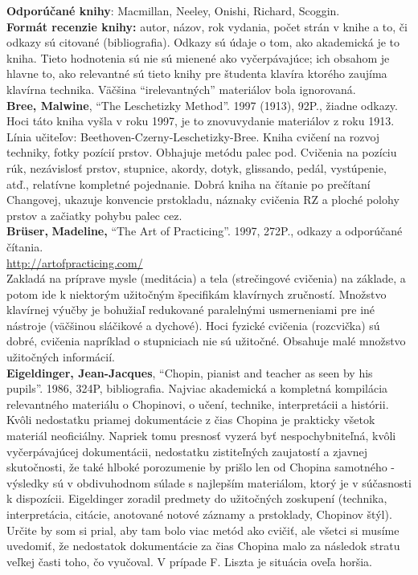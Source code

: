 \documentclass[11pt,a4paper]{book}
\begin{document}
\textbf{Odporúčané knihy}: Macmillan, Neeley, Onishi, Richard, Scoggin.
\medskip\\
\textbf{Formát recenzie knihy:} autor, názov, rok vydania, počet strán v knihe a to, či odkazy sú citované (bibliografia). Odkazy sú údaje o tom, ako akademická je to kniha. Tieto hodnotenia sú nie sú mienené ako vyčerpávajúce; ich obsahom je hlavne to, ako relevantné sú tieto knihy pre študenta klavíra ktorého zaujíma klavírna technika. Väčšina “irelevantných” materiálov bola ignorovaná.
\medskip\\
\textbf{Bree, Malwine}, “The Leschetizky Method”. 1997 (1913), 92P., žiadne odkazy. Hoci táto kniha vyšla v roku 1997, je to znovuvydanie materiálov z roku 1913.\\
Línia učiteľov: Beethoven-Czerny-Leschetizky-Bree. Kniha cvičení na rozvoj techniky, fotky pozícií prstov. Obhajuje metódu palec pod. Cvičenia na pozíciu rúk, nezávislosť prstov, stupnice, akordy, dotyk, glissando, pedál, vystúpenie, atď., relatívne kompletné pojednanie. Dobrá kniha na čítanie po prečítaní Changovej, ukazuje konvencie prstokladu, náznaky cvičenia RZ a ploché polohy prstov a začiatky pohybu palec cez. 
\medskip\\
\textbf{Brüser}\textbf{, }\textbf{Madeline}\textbf{,} “The Art of Practicing”. 1997, 272P., odkazy a odporúčané čítania.\\\href{http://artofpracticing.com/}{http://artofpracticing.com/}\\ Zakladá na príprave mysle (meditácia) a tela (strečingové cvičenia) na základe, a potom ide k niektorým užitočným špecifikám klavírnych zručností. Množstvo klavírnej výučby je bohužiaľ redukované paralelnými  usmerneniami pre iné nástroje (väčšinou sláčikové a dychové). Hoci fyzické cvičenia (rozcvička) sú dobré, cvičenia napríklad o stupniciach nie sú užitočné. Obsahuje malé množstvo užitočných informácií.
\medskip\\
\textbf{\hypertarget{r:eigeldinger}{Eigeldinger, Jean-Jacques}}, “Chopin, pianist and teacher as seen by his pupils”. 1986, 324P, bibliografia. Najviac akademická a kompletná kompilácia relevantného materiálu o Chopinovi, o učení, technike, interpretácii a histórii. Kvôli nedostatku priamej dokumentácie z čias Chopina je prakticky všetok materiál neoficiálny. Napriek tomu presnosť vyzerá byť nespochybniteľná, kvôli vyčerpávajúcej dokumentácii, nedostatku zistiteľných zaujatostí a zjavnej skutočnosti, že také hlboké porozumenie by prišlo len od Chopina samotného - výsledky sú v obdivuhodnom súlade s najlepším materiálom, ktorý je v súčasnosti k dispozícii. Eigeldinger zoradil predmety do užitočných zoskupení (technika, interpretácia, citácie, anotované notové záznamy a prstoklady, Chopinov štýl). Určite by som si prial, aby tam bolo viac metód ako cvičiť, ale všetci si musíme uvedomiť, že nedostatok dokumentácie za čias Chopina malo za následok stratu veľkej časti toho, čo vyučoval. V prípade F. Liszta je situácia oveľa horšia. 
\end{document}
